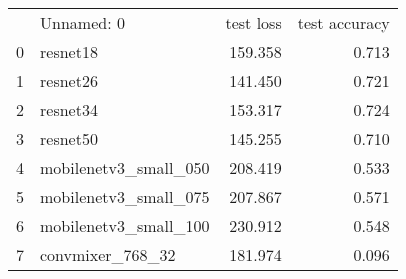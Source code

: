 \begin{tabular}{llrr}
 & Unnamed: 0 & test loss & test accuracy \\
0 & resnet18 & 159.358 & 0.713 \\
1 & resnet26 & 141.450 & 0.721 \\
2 & resnet34 & 153.317 & 0.724 \\
3 & resnet50 & 145.255 & 0.710 \\
4 & mobilenetv3_small_050 & 208.419 & 0.533 \\
5 & mobilenetv3_small_075 & 207.867 & 0.571 \\
6 & mobilenetv3_small_100 & 230.912 & 0.548 \\
7 & convmixer_768_32 & 181.974 & 0.096 \\
\end{tabular}
